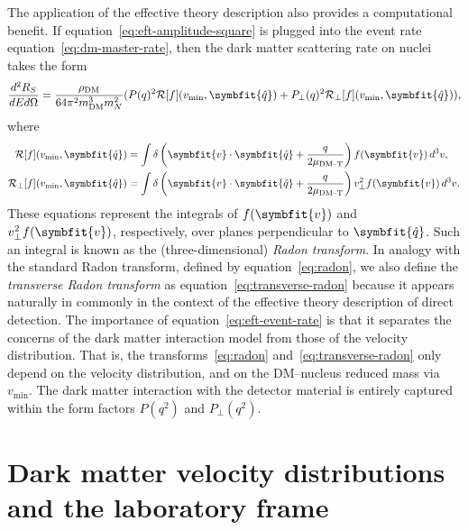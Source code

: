 \documentclass[b5paper, 10pt, twoside]{book}
\renewcommand{\vec}[1]{\symbfit{#1}}
\newcommand{\ddder}[3]{\frac{d^2#1}{d#2d#3}}
\newcommand{\unitv}[1]{\symbfit{\hat{#1}}}
\newcommand{\difd}{\,d}
\begin{document}
The application of the effective theory description also provides a computational benefit. If equation~\eqref{eq:eft-amplitude-square} is plugged into the event rate equation~\eqref{eq:dm-master-rate}, then the dark matter scattering rate on nuclei takes the form
\begin{equation}
\ddder{R_S}{E}{\Omega}=\frac{\rho_\text{DM}}{64\pi^2m_\text{DM}^3m_N^2}(P(q)^2\mathcal{R}[f](v_\text{min},\unitv{q})+P_\perp(q)^2\mathcal{R}_\perp[f](v_\text{min},\unitv{q})),
\label{eq:eft-event-rate}
\end{equation}
where
\begin{align}
\label{eq:radon}
\mathcal{R}[f](v_\text{min},\unitv{q})&=\int\delta\left(\vec{v}\cdot\unitv{q}+\frac{q}{2\mu_\text{DM--T}}\right)f(\vec{v})\difd^3v,\\
\label{eq:transverse-radon}
\mathcal{R}_\perp[f](v_\text{min},\unitv{q})&=\int\delta\left(\vec{v}\cdot\unitv{q}+\frac{q}{2\mu_\text{DM--T}}\right)v_\perp^2f(\vec{v})\difd^3v.
\end{align}
These equations represent the integrals of $f(\vec{v})$ and $v_\perp^2f(\vec{v})$, respectively, over planes perpendicular to $\unitv{q}$. Such an integral is known as the (three-dimensional) \emph{Radon transform}. In analogy with the standard Radon transform, defined by equation~\eqref{eq:radon}, we also define the \emph{transverse Radon transform} as equation~\eqref{eq:transverse-radon} because it appears naturally in commonly in the context of the effective theory description of direct detection. The importance of equation~\eqref{eq:eft-event-rate} is that it separates the concerns of the dark matter interaction model from those of the velocity distribution. That is, the transforms~\eqref{eq:radon} and~\eqref{eq:transverse-radon} only depend on the velocity distribution, and on the DM--nucleus reduced mass via $v_\text{min}$. The dark matter interaction with the detector material is entirely captured within the form factors $P(q^2)$ and $P_\perp(q^2)$.

\chapter{Dark matter velocity distributions and the laboratory frame}
\label{chap:dist}
\end{document}
